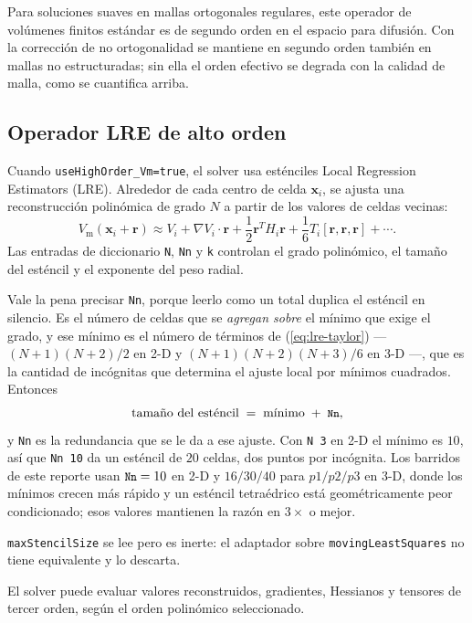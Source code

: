\documentclass[11pt,a4paper]{article}
\newcommand{\code}[1]{\texttt{\small #1}}
\newcommand{\Vm}{V_{\text{m}}}
\newcommand{\grad}{\nabla}
\begin{document}
Para soluciones suaves en mallas ortogonales regulares, este operador de volúmenes finitos
estándar es de segundo orden en el espacio para difusión. Con la corrección de no
ortogonalidad se mantiene en segundo orden también en mallas no estructuradas; sin ella el
orden efectivo se degrada con la calidad de malla, como se cuantifica arriba.

\subsection{Operador LRE de alto orden}
\label{sec:lre}

Cuando \code{useHighOrder\_Vm=true}, el solver usa esténciles Local Regression Estimators
(LRE). Alrededor de cada centro de celda $\mathbf{x}_i$, se ajusta una reconstrucción
polinómica de grado $N$ a partir de los valores de celdas vecinas:
\begin{equation}
  \Vm(\mathbf{x}_i+\mathbf{r})
  \approx
  V_i
  + \grad V_i\cdot\mathbf{r}
  + \frac{1}{2}\mathbf{r}^{T}H_i\mathbf{r}
  + \frac{1}{6}T_i[\mathbf{r},\mathbf{r},\mathbf{r}]
  + \cdots.
  \label{eq:lre-taylor}
\end{equation}
Las entradas de diccionario \code{N}, \code{Nn} y \code{k} controlan el grado polinómico, el
tamaño del esténcil y el exponente del peso radial.

Vale la pena precisar \code{Nn}, porque leerlo como un total duplica el esténcil en silencio.
Es el número de celdas que se \emph{agregan sobre} el mínimo que exige el grado, y ese mínimo
es el número de términos de (\ref{eq:lre-taylor}) --- $(N{+}1)(N{+}2)/2$ en 2-D y
$(N{+}1)(N{+}2)(N{+}3)/6$ en 3-D ---, que es la cantidad de incógnitas que determina el ajuste
local por mínimos cuadrados. Entonces
%
\[ \text{tamaño del esténcil} \;=\; \text{mínimo} \;+\; \code{Nn}, \]
%
y \code{Nn} es la redundancia que se le da a ese ajuste. Con \code{N 3} en 2-D el mínimo es
$10$, así que \code{Nn 10} da un esténcil de $20$ celdas, dos puntos por incógnita. Los
barridos de este reporte usan $\code{Nn}=10$ en 2-D y $16/30/40$ para $p1/p2/p3$ en 3-D, donde
los mínimos crecen más rápido y un esténcil tetraédrico está geométricamente peor condicionado;
esos valores mantienen la razón en $3\times$ o mejor.

\code{maxStencilSize} se lee pero es inerte: el adaptador sobre \code{movingLeastSquares} no
tiene equivalente y lo descarta.

El solver puede evaluar valores reconstruidos, gradientes, Hessianos y tensores de tercer
orden, según el orden polinómico seleccionado.
\end{document}
